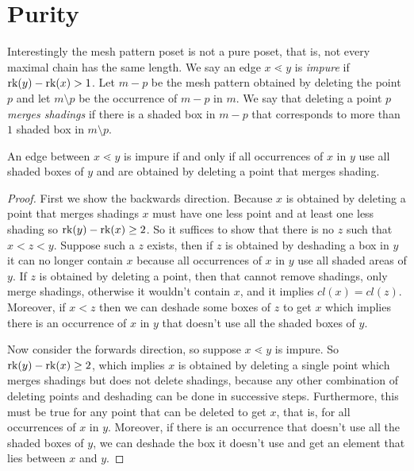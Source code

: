 \documentclass[11pt,a4paper,oneside]{article}
\begin{document}
\section{Purity}

Interestingly the mesh pattern poset is not a pure poset, that is, not every maximal chain has the same length. We say an edge $x\lessdot y$ is \emph{impure} if $\operatorname{\textrm{rk}}(y)-\operatorname{\textrm{rk}}(x)>1$. Let $m-p$ be the mesh pattern obtained by deleting the point $p$ and let $m\setminus p$ be the occurrence of $m-p$ in $m$. We say that deleting a point $p$ \emph{merges shadings} if there is a shaded box in $m-p$ that corresponds to more than $1$ shaded box in $m\setminus p$.

\begin{lem}\label{lem:impureEdge}
An edge between $x\lessdot y$ is impure if and only if all occurrences of $x$ in $y$ use all shaded boxes of $y$ and are obtained by deleting a point that merges shading.
\begin{proof}
First we show the backwards direction. Because $x$ is obtained by deleting a point that merges shadings $x$ must have one less point and at least one less shading so $\operatorname{\textrm{rk}}(y)-\operatorname{\textrm{rk}}(x)\ge2$. So it suffices to show that there is no $z$ such that $x<z<y$. Suppose such a $z$ exists, then if $z$ is obtained by deshading a box in $y$ it can no longer contain $x$ because all occurrences of $x$ in $y$ use all shaded areas of $y$. If $z$ is obtained by deleting a point, then that cannot remove shadings, only merge shadings, otherwise it wouldn't contain $x$, and it implies $cl(x)=cl(z)$. Moreover, if $x<z$ then we can deshade some boxes of $z$ to get $x$ which implies there is an occurrence of $x$ in $y$ that doesn't use all the shaded boxes of $y$.

Now consider the forwards direction, so suppose $x\lessdot y$ is impure. So $\operatorname{\textrm{rk}}(y)-\operatorname{\textrm{rk}}(x)\ge2$, which implies $x$ is obtained by deleting a single point which merges shadings but does not delete shadings, because any other combination of deleting points and deshading can be done in successive steps. Furthermore, this must be true for any point that can be deleted to get $x$, that is, for all occurrences of $x$ in $y$. Moreover, if there is an occurrence that doesn't use all the shaded boxes of $y$, we can deshade the box it doesn't use and get an element that lies between $x$ and $y$.
\end{proof} 
\end{lem}
\end{document}
